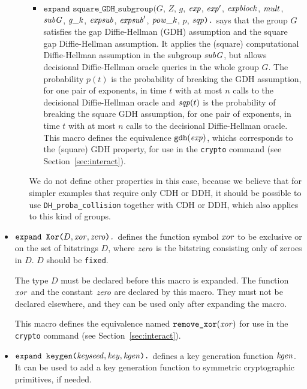 \documentclass{article}
\begin{document}
\begin{itemize}
\begin{itemize}
\begin{itemize}
     \item $\texttt{expand\ square\_GDH\_subgroup(}G$, $Z$, $g$, $\mathit{exp}$, $\mathit{exp}'$, $\mathit{expblock}$, $\mathit{mult}$, $\mathit{subG}$, $\mathit{g\_k}$, $\mathit{expsub}$, $\mathit{expsub}'$, $\mathit{pow\_k}$, $p$, $\mathit{sqp}\texttt{).}$ 
       says that the group $G$ satisfies the gap Diffie-Hellman (GDH)
       assumption and the square gap Diffie-Hellman assumption. It applies the (square) computational Diffie-Hellman assumption in the subgroup $\mathit{subG}$, but allows decisional Diffie-Hellman oracle queries in the whole group $G$.
       The probability $p(t)$ is the probability of breaking the GDH assumption, for
       one pair of exponents, in time $t$ with at most $n$ 
       calls to the decisional Diffie-Hellman oracle and $\mathit{sqp}(t)$ is the
       probability of breaking the square GDH assumption, for one pair
       of exponents, in time $t$ with at most $n$ 
       calls to the decisional Diffie-Hellman oracle.  This macro defines the equivalence
       $\texttt{gdh}(\mathit{exp})$, whichs corresponds to the (square)
       GDH property, for use in the \texttt{crypto} command (see
       Section~\ref{sec:interact}).
     \end{itemize}
     We do not define other properties in this case, because we
     believe that for simpler examples that require only CDH or DDH,
     it should be possible to use \texttt{DH\_proba\_collision}
     together with CDH or DDH, which also applies to this kind of
     groups.

   \end{itemize}
\fi  
\item $\texttt{expand\ Xor(}D, \mathit{xor}, \mathit{zero}\texttt{).}$ defines the
  function symbol $\mathit{xor}$ to be exclusive or on the set of
  bitstrings $D$, where $\mathit{zero}$ is the bitstring consisting only
  of zeroes in $D$. $D$ should be \texttt{fixed}.

  The type $D$ must be declared before this macro is expanded. The
  function $\mathit{xor}$ and the constant $\mathit{zero}$ are declared by
  this macro.  They must not be declared elsewhere, and they can be
  used only after expanding the macro.

   This macro defines the equivalence named $\texttt{remove\_xor}(\mathit{xor})$
   for use in the \texttt{crypto} command 
   (see Section~\ref{sec:interact}).

\item $\texttt{expand\ keygen(}\mathit{keyseed}, \mathit{key}, \mathit{kgen}\texttt{).}$
defines a key generation function $\mathit{kgen}$. It can be used to add a key
generation function to symmetric cryptographic primitives, if needed.


\end{itemize}
\end{document}
